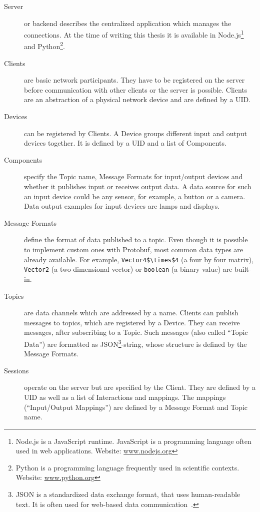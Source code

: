 \begin{description}
  \item[Server] or backend describes the centralized application which manages the connections. At the time of writing this thesis it is available in Node.js\footnote{Node.js is a JavaScript runtime. JavaScript is a programming language often used in web applications. Website: \href{https://nodejs.org/}{www.nodejs.org}} and Python\footnote{Python is a programming language frequently used in scientific contexts. Website: \href{https://www.python.org/}{www.python.org}}.
	\item[Clients] are basic network participants. They have to be registered on the server before communication with other clients or the server is possible. Clients are an abstraction of a physical network device and are defined by a \ac{UID}. 
	\item[Devices] can be registered by Clients. A Device groups different input and output devices together. It is defined by a \ac{UID} and a list of Components.
  \item[Components] specify the Topic name, Message Formats for input/output devices and whether it publishes input or receives output data. A data source for such an input device could be any sensor, for example, a button or a camera. Data output examples for input devices are lamps and displays.
  \item[Message Formats] define the format of data published to a topic. Even though it is possible to implement custom ones with \ac{Protobuf}, most common data types are already available. For example, \lstinline[mathescape=true]{Vector4$\times$4} (a four by four matrix), \lstinline{Vector2} (a two-dimensional vector) or \lstinline{boolean} (a binary value) are built-in. %
	\item[Topics] are data channels which are addressed by a name. Clients can publish messages to topics, which are registered by a Device. They can receive messages, after subscribing to a Topic. Such messages (also called \enquote{Topic Data}) are formatted as JSON\footnote{JSON is a standardized data exchange format, that uses human-readable text. It is often used for web-based data communication~\cite[iii]{ECMAInternational.2017}.}-string, whose structure is defined by the Message Formats.
	\item[Sessions] operate on the server but are specified by the Client. They are defined by a \ac{UID} as well as a list of Interactions and mappings. The mappings (\enquote{Input/Output Mappings}) are defined by a Message Format and Topic name.

\end{description}
